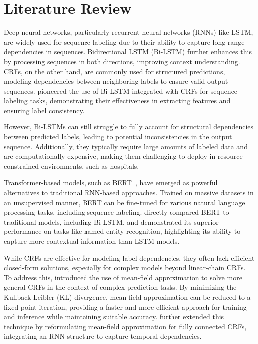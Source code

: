 \documentclass[12pt]{article}
\begin{document}
\section{Literature Review}


Deep neural networks, particularly recurrent neural networks (RNNs) like LSTM,
are widely used for sequence labeling due to their ability to capture
long-range dependencies in sequences. Bidirectional LSTM (Bi-LSTM) further
enhances this by processing sequences in both directions, improving context
understanding.
CRFs, on the other hand, are commonly used for structured predictions,
modeling dependencies between neighboring labels to ensure valid output
sequences.
\citet{huang2015bidirectional} pioneered the use of Bi-LSTM integrated with
CRFs for sequence labeling tasks, demonstrating their effectiveness in
extracting features and ensuring label consistency.


However, Bi-LSTMs can still struggle to fully account for structural
dependencies between predicted labels, leading to potential inconsistencies in
the output sequence. Additionally, they typically require large amounts of
labeled data and are computationally expensive, making them challenging to
deploy in resource-constrained environments, such as hospitals.


Transformer-based models, such as BERT~\citep{devlin2019bert},
have emerged as powerful alternatives to traditional RNN-based approaches.
Trained on massive datasets in an unsupervised manner, BERT can be fine-tuned
for various natural language processing tasks, including sequence labeling.
\citet{devlin2019bert} directly compared BERT to traditional models, including
Bi-LSTM, and demonstrated its superior performance on tasks like named entity
recognition, highlighting its ability to capture more contextual information
than LSTM models.


While CRFs are effective for modeling label dependencies, they often lack
efficient closed-form solutions, especially for complex models beyond
linear-chain CRFs. To address this, \citet{krahenbuhl2011efficient} introduced
the use of mean-field approximation to solve more general CRFs in the context
of complex prediction tasks. By minimizing the Kullback-Leibler (KL)
divergence, mean-field approximation can be reduced to a fixed-point iteration,
providing a faster and more efficient approach for training and inference
while maintaining suitable accuracy. \citet{zheng2015conditional} further
extended this technique by reformulating mean-field approximation for fully
connected CRFs, integrating an RNN structure to capture temporal dependencies.
\end{document}
